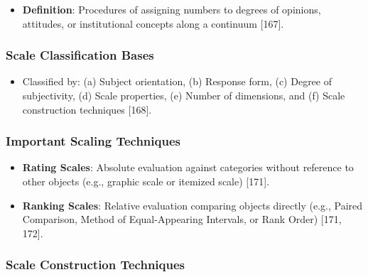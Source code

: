 \documentclass[
]{article}
\providecommand{\tightlist}{%
  \setlength{\itemsep}{0pt}\setlength{\parskip}{0pt}}
\begin{document}
\begin{itemize}
\tightlist
\item
  \textbf{Definition}: Procedures of assigning numbers to degrees of
  opinions, attitudes, or institutional concepts along a continuum
  {[}167{]}.
\end{itemize}

\subsubsection{Scale Classification
Bases}\label{scale-classification-bases}

\begin{itemize}
\tightlist
\item
  Classified by: (a) Subject orientation, (b) Response form, (c) Degree
  of subjectivity, (d) Scale properties, (e) Number of dimensions, and
  (f) Scale construction techniques {[}168{]}.
\end{itemize}

\subsubsection{Important Scaling
Techniques}\label{important-scaling-techniques}

\begin{itemize}
\tightlist
\item
  \textbf{Rating Scales}: Absolute evaluation against categories without
  reference to other objects (e.g., graphic scale or itemized scale)
  {[}171{]}.
\item
  \textbf{Ranking Scales}: Relative evaluation comparing objects
  directly (e.g., Paired Comparison, Method of Equal-Appearing
  Intervals, or Rank Order) {[}171, 172{]}.
\end{itemize}

\subsubsection{Scale Construction
Techniques}\label{scale-construction-techniques}
\end{document}
